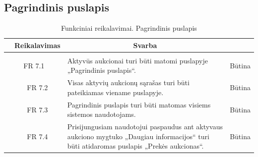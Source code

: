 \documentclass{VUMIFPSkursinis}
\begin{document}
	\subsection{Pagrindinis puslapis}
	\begin{table}[H]
		\caption{Funkciniai reikalavimai. Pagrindinis puslapis}
		\begin{tabular}{|p{1cm}|p{1cm}|p{}|p{}|}
			\hline 
			\rowcolor{gray!50}
			\multicolumn{2}{|c|}{{\bfseries Kodas}}&
			\multicolumn{1}{c|}{{\bfseries Reikalavimas}}&
			\multicolumn{1}{c|}{{\bfseries Svarba}}\\
			\hline
			\rowcolor{lightgray}
			\multicolumn{4}{|c|}{Pagrindinis puslapis}\\		
			
			\hline
			\multicolumn{2}{|c|}{FR 7.1}&
			{Aktyvūs aukcionai turi būti matomi puslapyje „Pagrindinis puslapis“.
			}&		
			\multicolumn{1}{c|}{Būtina}\\
			\hline
			\multicolumn{1}{|c}{}&
			\multicolumn{1}{c|}{FR 7.2}&
			{Visas aktyvių aukcionų sąrašas turi būti pateikiamas viename puslapyje.
			}&		
			\multicolumn{1}{c|}{Būtina}\\
			\hline	
			\multicolumn{1}{|c}{}&
			\multicolumn{1}{c|}{FR 7.3}&
			{Pagrindinis puslapis turi būti matomas visiems sistemos naudotojams.
			}&
			\multicolumn{1}{c|}{Būtina}\\									
			\hline
			\multicolumn{1}{|c}{}&
			\multicolumn{1}{c|}{FR 7.4}&
			{Prisijungusiam naudotojui paspaudus ant aktyvaus aukciono mygtuko „Daugiau informacijos“ turi būti atidaromas puslapis „Prekės aukcionas“.
			}&
			\multicolumn{1}{c|}{Būtina}\\									
			\hline
		\end{tabular}		
	\end{table}
	
\end{document}
